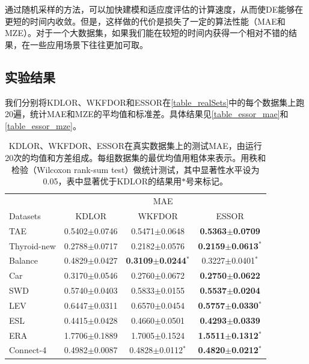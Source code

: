 通过随机采样的方法，可以加快建模和适应度评估的计算速度，从而使DE能够在更短的时间内收敛。但是，这样做的代价是损失了一定的算法性能（MAE和MZE）。对于一个大数据集，如果我们能在较短的时间内获得一个相对不错的结果，在一些应用场景下往往更加可取。

\subsection{实验结果}
我们分别将KDLOR、WKFDOR和ESSOR在\autoref{table_realSets}中的每个数据集上跑20遍，统计MAE和MZE的平均值和标准差。具体结果见\autoref{table_essor_mae}和\autoref{table_essor_mze}。

\begin{table}[!htbp]
\caption{KDLOR、WKFDOR、ESSOR在真实数据集上的测试MAE，由运行20次的均值和方差组成。每组数据集的最优均值用粗体来表示。用秩和检验（Wilcoxon rank-sum test）做统计测试，其中显著性水平设为0.05，表中显著优于KDLOR的结果用$*$号来标记。}
\label{table_essor_mae}
\centering
\begin{tabular}{l|ccc}
\toprule
 & \multicolumn {3}{c}{MAE} \\
 \cmidrule {2-4}
Datasets & KDLOR & WKFDOR & ESSOR \\
\midrule
TAE &  0.5402$\pm$0.0746 &  0.5471$\pm$0.0648 & {\bf 0.5363$\pm$0.0709} \\
Thyroid-new & 0.2788$\pm$0.0717 &  0.2182$\pm$0.0576 & {\bf 0.2159$\pm$0.0613}$^{*}$ \\
Balance & 0.4829$\pm$0.0427 &  {\bf 0.3109$\pm$0.0244}$^{*}$ & 0.3227$\pm$0.0401$^{*}$ \\
Car & 0.3170$\pm$0.0546 &  0.2760$\pm$0.0672 & {\bf 0.2750$\pm$0.0622} \\
SWD & 0.5740$\pm$0.0403 &  0.5833$\pm$0.0155 & {\bf 0.5537$\pm$0.0204} \\
LEV & 0.6447$\pm$0.0311 &  0.6570$\pm$0.0454 & {\bf 0.5757$\pm$0.0330}$^{*}$ \\
ESL & 0.4415$\pm$0.0428 &  0.4660$\pm$0.0501 & {\bf 0.4293$\pm$0.0339} \\
ERA & 1.7706$\pm$0.1889 &  1.7005$\pm$0.1524 & {\bf 1.5511$\pm$0.1312}$^{*}$ \\
Connect-4 & 0.4982$\pm$0.0087 & 0.4828$\pm$0.0112$^{*}$ & {\bf 0.4820$\pm$0.0212}$^{*}$ \\
\bottomrule
\end{tabular}
\end{table}

